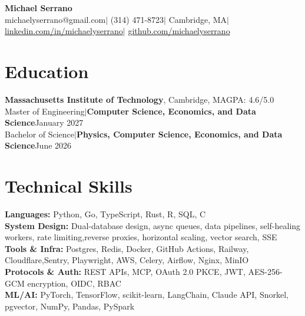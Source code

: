 \documentclass[letterpaper,10pt]{article}
\begin{document}
\begin{center}
  {\fontsize{17}{18}\selectfont\bfseries Michael Serrano}\\[2pt]
  \footnotesize
  michaelyserrano@gmail.com\enspace$|$\enspace
  (314) 471-8723\enspace$|$\enspace
  Cambridge, MA\enspace$|$\enspace
  \href{https://linkedin.com/in/michaelyserrano}{linkedin.com/in/michaelyserrano}\enspace$|$\enspace
  \href{https://github.com/michaelyserrano}{github.com/michaelyserrano}
\end{center}

\vspace{-8pt}

\section{Education}

\vspace{5pt}
\noindent\textbf{Massachusetts Institute of Technology}, Cambridge, MA\hfill GPA: 4.6/5.0\\
Master of Engineering\enspace$|$\enspace\textbf{Computer Science, Economics, and Data Science}\hfill January 2027\\
Bachelor of Science\enspace$|$\enspace\textbf{Physics, Computer Science, Economics, and Data Science}\hfill June 2026

\section{Technical Skills}

\vspace{5pt}
\noindent\textbf{Languages:} Python, Go, TypeScript, Rust, R, SQL, C\\
\textbf{System Design:} Dual-database design, async queues, data pipelines, self-healing workers, rate limiting,\linebreak[3] reverse proxies, horizontal scaling, vector search, SSE\\
\textbf{Tools \& Infra:} Postgres, Redis, Docker, GitHub Actions, Railway, Cloudflare,\linebreak[3] Sentry, Playwright, AWS, Celery, Airflow, Nginx, MinIO\\
\textbf{Protocols \& Auth:} REST APIs, MCP, OAuth 2.0 PKCE, JWT, AES-256-GCM encryption, OIDC, RBAC\\
\textbf{ML/AI:} PyTorch, TensorFlow, scikit-learn, LangChain, Claude API, Snorkel, pgvector, NumPy, Pandas, PySpark
\end{document}
